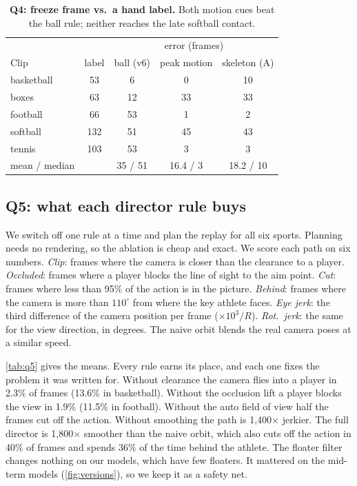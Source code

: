 \documentclass[10pt,twocolumn,letterpaper]{article}
\begin{document}
\begin{table}[t]
\centering\small
\setlength{\tabcolsep}{3.6pt}
\begin{tabular}{lc|ccc}
\toprule
& & \multicolumn{3}{c}{error (frames)}\\
Clip & label & ball (v6) & peak motion & skeleton (A)\\
\midrule
basketball & 53 & 6 & 0 & 10\\
boxes & 63 & 12 & 33 & 33\\
football & 66 & 53 & 1 & 2\\
softball & 132 & 51 & 45 & 43\\
tennis & 103 & 53 & 3 & 3\\
\midrule
mean / median & & 35 / 51 & 16.4 / 3 & 18.2 / 10\\
\bottomrule
\end{tabular}
\vspace{-0.6em}
\caption{\textbf{Q4: freeze frame vs.\ a hand label.} Both motion cues beat the ball rule; neither reaches the late softball contact.}
\label{tab:q4}
\vspace{-1em}
\end{table}

\subsection{Q5: what each director rule buys}
\label{sec:q5}
We switch off one rule at a time and plan the replay for all six sports. Planning needs no rendering, so the ablation is cheap and exact. We score each path on six numbers. \emph{Clip}: frames where the camera is closer than the clearance to a player. \emph{Occluded}: frames where a player blocks the line of sight to the aim point. \emph{Cut}: frames where less than 95\% of the action is in the picture. \emph{Behind}: frames where the camera is more than $110^\circ$ from where the key athlete faces. \emph{Eye jerk}: the third difference of the camera position per frame ($\times10^3/R$). \emph{Rot.\ jerk}: the same for the view direction, in degrees. The naive orbit blends the real camera poses at a similar speed.

\cref{tab:q5} gives the means. Every rule earns its place, and each one fixes the problem it was written for. Without clearance the camera flies into a player in 2.3\% of frames (13.6\% in basketball). Without the occlusion lift a player blocks the view in 1.9\% (11.5\% in football). Without the auto field of view half the frames cut off the action. Without smoothing the path is 1,400$\times$ jerkier. The full director is 1,800$\times$ smoother than the naive orbit, which also cuts off the action in 40\% of frames and spends 36\% of the time behind the athlete. The floater filter changes nothing on our models, which have few floaters. It mattered on the mid-term models (\cref{fig:versions}), so we keep it as a safety net.
\end{document}
